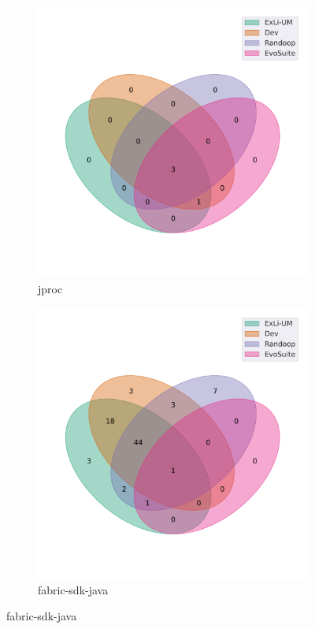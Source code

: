 \begin{figure}[t]\ContinuedFloat
\begin{subfigure}[b]{0.45\textwidth}
\includegraphics[width=\textwidth]{figures/venn/fleipold_jproc-venn.pdf}
\vspace{-10pt}
\caption{jproc}
\label{fig:venn-fleipold_jproc}
\end{subfigure}
\hfill
\begin{subfigure}[b]{0.45\textwidth}
\includegraphics[width=\textwidth]{figures/venn/hyperledger_fabric-sdk-java-venn.pdf}
\vspace{-10pt}
\caption{fabric-sdk-java}
\label{fig:venn-hyperledger_fabric-sdk-java}
\end{subfigure}
\end{figure}
